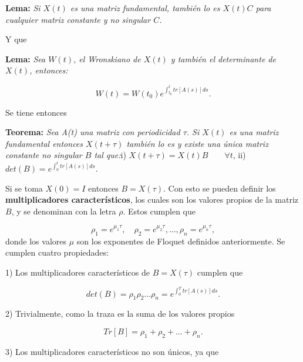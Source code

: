 \documentclass[10pt,a4paper]{report}
\begin{document}
\begin{center}
\textbf{Lema:} \textit{Si $X(t)$ es una matriz fundamental, también lo es $X(t)C$ para cualquier matriz constante y no singular $C$.}
\end{center}Y que

\begin{center}
\textbf{Lema:} \textit{Sea $W(t)$, el Wronskiano de $X(t)$ y también el determinante de $X(t)$,
  entonces:}

\begin{equation}
W(t) = W(t_0) e^{\int_{t_0}^{t}tr[A(s)]ds}.
\end{equation}
 
\end{center} Se tiene entonces

\begin{center}
\textbf{Teorema:} \textit{Sea A(t) una matriz con periodicidad $\tau$.
  Si $X(t)$ es una matriz fundamental entonces $X(t+\tau)$ también lo
  es y existe una única matriz constante no singular $B$ tal
  que:}\linebreak \linebreak i) $X(t+\tau) = X(t)B \qquad\forall t$,
\linebreak ii) $det(B) = e^{\int_0^t tr[A(s)]ds}.$
\end{center}
Si se toma $X(0)=I$ entonces $B=X(\tau)$. Con esto se pueden definir
los \textbf{multiplicadores característicos}, los cuales son los
valores propios de la matriz $B$, y se denominan con la letra $\rho$.
Estos cumplen que

\begin{equation}
\rho_1 = e^{\mu_1 \tau}, \quad \rho_2 = e^{\mu_2 \tau}, ... , \rho_n =
e^{\mu_n \tau},
\end{equation} donde los valores $\mu$ son los exponentes de Floquet definidos anteriormente. Se cumplen cuatro propiedades:

1) Los multiplicadores característicos de $B=X(\tau)$ cumplen que

\begin{equation}
det(B) = \rho_1 \rho_2 ... \rho_n = e^{\int_0^T tr[A(s)]ds}.
\end{equation}

2) Trivialmente, como la traza es la suma de los valores propios

\begin{equation}
Tr[B] = \rho_1 + \rho_2 + ... + \rho_n.
\end{equation}

3) Los multiplicadores característicos no son únicos, ya que
\end{document}
